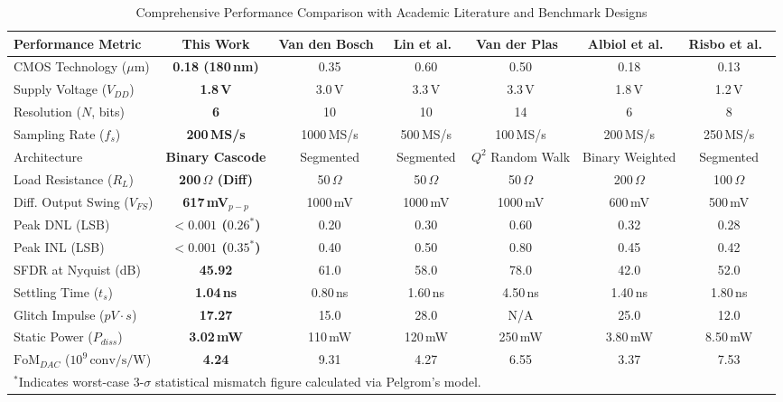 \documentclass[conference,10pt]{IEEEtran}
\begin{document}
\begin{table}[t]
\centering
\caption{Comprehensive Performance Comparison with Academic Literature and Benchmark Designs}
\label{tab:comparison}
\begin{tabular}{lcccccc}
\toprule
\textbf{Performance Metric} & \textbf{This Work} & \textbf{Van den Bosch~\cite{vandenbosch_10bit_1gsps}} & \textbf{Lin et al.~\cite{lin_12bit_dac}} & \textbf{Van der Plas~\cite{deveirman_dac_review}} & \textbf{Albiol et al.~\cite{albiol_mismatch_yield}} & \textbf{Risbo et al.~\cite{merritt_high_speed_dac}} \\
\midrule
CMOS Technology ($\mu\text{m}$) & \textbf{0.18 (180\,nm)} & 0.35 & 0.60 & 0.50 & 0.18 & 0.13 \\
Supply Voltage ($V_{DD}$) & \textbf{1.8\,V} & 3.0\,V & 3.3\,V & 3.3\,V & 1.8\,V & 1.2\,V \\
Resolution ($N$, bits) & \textbf{6} & 10 & 10 & 14 & 6 & 8 \\
Sampling Rate ($f_s$) & \textbf{200\,MS/s} & 1000\,MS/s & 500\,MS/s & 100\,MS/s & 200\,MS/s & 250\,MS/s \\
Architecture & \textbf{Binary Cascode} & Segmented & Segmented & $Q^2$ Random Walk & Binary Weighted & Segmented \\
Load Resistance ($R_L$) & \textbf{200\,$\Omega$ (Diff)} & 50\,$\Omega$ & 50\,$\Omega$ & 50\,$\Omega$ & 200\,$\Omega$ & 100\,$\Omega$ \\
Diff. Output Swing ($V_{FS}$) & \textbf{617\,mV$_{p-p}$} & 1000\,mV & 1000\,mV & 1000\,mV & 600\,mV & 500\,mV \\
Peak DNL (LSB) & \textbf{$< 0.001$ ($0.26^*$)} & 0.20 & 0.30 & 0.60 & 0.32 & 0.28 \\
Peak INL (LSB) & \textbf{$< 0.001$ ($0.35^*$)} & 0.40 & 0.50 & 0.80 & 0.45 & 0.42 \\
SFDR at Nyquist (dB) & \textbf{45.92} & 61.0 & 58.0 & 78.0 & 42.0 & 52.0 \\
Settling Time ($t_s$) & \textbf{1.04\,ns} & 0.80\,ns & 1.60\,ns & 4.50\,ns & 1.40\,ns & 1.80\,ns \\
Glitch Impulse ($pV\cdot s$) & \textbf{17.27} & 15.0 & 28.0 & N/A & 25.0 & 12.0 \\
Static Power ($P_{diss}$) & \textbf{3.02\,mW} & 110\,mW & 120\,mW & 250\,mW & 3.80\,mW & 8.50\,mW \\
$\text{FoM}_{DAC}$ ($10^9\,\text{conv/s/W}$) & \textbf{4.24} & 9.31 & 4.27 & 6.55 & 3.37 & 7.53 \\
\bottomrule
\multicolumn{7}{l}{\footnotesize $^*$Indicates worst-case 3-$\sigma$ statistical mismatch figure calculated via Pelgrom's model.}
\end{tabular}
\end{table}
\end{document}
